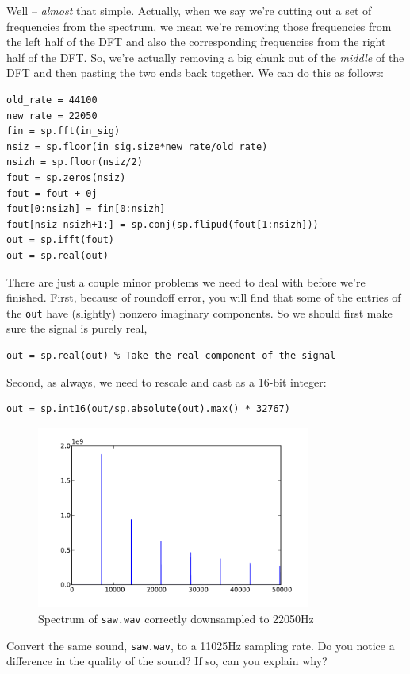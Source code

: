 Well -- \emph{almost} that simple. Actually, when we say we're cutting out a set of frequencies from the spectrum, we mean we're removing those frequencies from the left half of the DFT and also the corresponding frequencies from the right half of the DFT. So, we're actually removing a big chunk out of the \emph{middle} of the DFT and then pasting the two ends back together. We can do this as follows:
\begin{lstlisting}
old_rate = 44100
new_rate = 22050
fin = sp.fft(in_sig)
nsiz = sp.floor(in_sig.size*new_rate/old_rate)
nsizh = sp.floor(nsiz/2)
fout = sp.zeros(nsiz)
fout = fout + 0j
fout[0:nsizh] = fin[0:nsizh]
fout[nsiz-nsizh+1:] = sp.conj(sp.flipud(fout[1:nsizh]))
out = sp.ifft(fout)
out = sp.real(out)
\end{lstlisting}
There are just a couple minor problems we need to deal with before we're finished. First, because of roundoff error, you will find that some of the entries of the \texttt{out} have (slightly) nonzero imaginary components.  So we should first make sure the signal is purely real,
\begin{lstlisting}
out = sp.real(out) % Take the real component of the signal
\end{lstlisting}
Second, as always, we need to rescale and cast as a 16-bit integer:
\begin{lstlisting}
out = sp.int16(out/sp.absolute(out).max() * 32767)
\end{lstlisting}


\begin{figure}[ht]\caption{Spectrum of \texttt{saw.wav} correctly downsampled to 22050Hz}\label{sawspecdown2}\centering\includegraphics[width=90mm]{sawdownspec}\end{figure}

\begin{problem}
Convert the same sound, \texttt{saw.wav}, to a 11025Hz sampling rate. Do you notice a difference in the quality of the sound? If so, can you explain why?
\end{problem}

